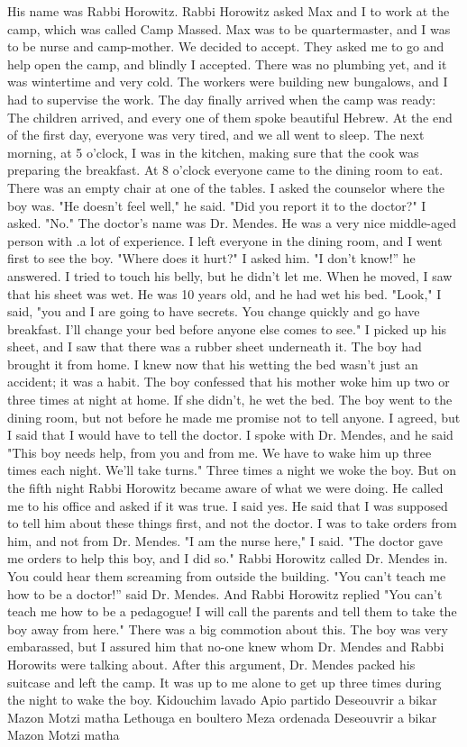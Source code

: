 His name was Rabbi Horowitz.
Rabbi Horowitz asked Max and I to work at the camp, which was called Camp Massed.
Max was to be quartermaster, and I was to be nurse and camp-mother.
We decided to accept.
They asked me to go and help open the camp, and blindly I accepted.
There was no 
plumbing yet, and it was wintertime and very cold.
The workers were building new bungalows, and I had to supervise the work.
The day finally arrived when the camp was 
ready: The children arrived, and every one of them spoke beautiful Hebrew.
At the end of the first day, everyone was very tired, and we all went to sleep.
The next morning, at 5 o'clock, I was in the kitchen, making sure that the cook was 
preparing the breakfast.
At 8 o'clock everyone came to the dining room to eat.
There 
was an empty chair at one of the tables.
I asked the counselor where the boy was.
"He doesn't feel well," he said.
"Did you report it to the doctor?"
I asked.
"No."
The doctor's name was Dr.
Mendes.
He was a very nice middle-aged person with .a 
lot of experience.
I left everyone in the dining room, and I went first to see the boy.
"Where does it hurt?"
I asked him.
"I don't know!” he answered.
I tried to touch his belly, but he didn't let me.
When he moved, I saw that his 
sheet was wet.
He was 10 years old, and he had wet his bed.
"Look," I said, "you and I are going to have secrets.
You change quickly and go 
have breakfast.
I'll change your bed before anyone else comes to see."
I picked up 
his sheet, and I saw that there was a rubber sheet underneath it.
The boy had brought 
it from home.
I knew now that his wetting the bed wasn't just an accident; it was a 
habit.
The boy confessed that his mother woke him up two or three times at night at 
home.
If she didn't, he wet the bed.
The boy went to the dining room, but not before he 
made me promise not to tell anyone.
I agreed, but I said that I would have to tell 
the doctor.
I spoke with Dr.
Mendes, and he said "This boy needs help, from you and from me.
We have to wake him up three times each night.
We'll take turns."
Three times a night 
we woke the boy.
But on the fifth night Rabbi Horowitz became aware of what we were doing.
He called me to his office and asked if it was true.
I said yes.
He
said that I was supposed to tell him about these things first, and not the doctor.
I
was to take orders from him, and not from Dr.
Mendes.
"I am the nurse here," I said.
"The doctor gave me orders to help this boy, and
I did so."
Rabbi Horowitz called Dr.
Mendes in.
You could hear them screaming from outside 
the building.
"You can't teach me how to be a doctor!” said Dr.
Mendes.
And Rabbi Horowitz replied "You can't teach me how to be a pedagogue!
I will 
call the parents and tell them to take the boy away from here."
There was a big commotion about this.
The boy was very embarassed, but I assured
him that no-one knew whom Dr.
Mendes and Rabbi Horowits were talking about.
After this argument, Dr.
Mendes packed his suitcase and left the camp.
It was up 
to me alone to get up three times during the night to wake the boy.
Kidouchim lavado 
Apio partido 
Deseouvrir a bikar 
Mazon 
Motzi matha 
Lethouga en boultero 
Meza ordenada 
Deseouvrir a bikar 
Mazon 
Motzi matha
